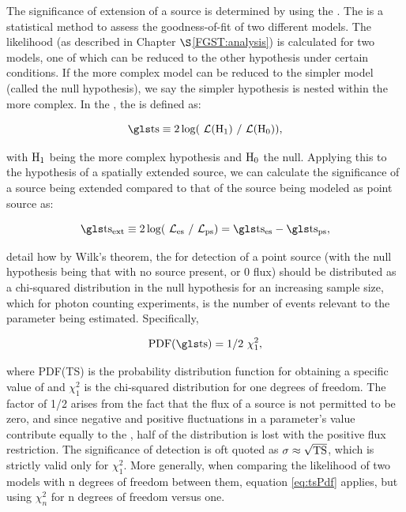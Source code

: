 {The significance of extension of a source is determined by using the \lrt{}. The \lrt{} is a statistical method to assess the goodness-of-fit of two different models. The likelihood (as described in Chapter $\S$\ref{FGST:analysis}) is calculated  for two models, one of which can be reduced to the other hypothesis under certain conditions. If the more complex model can be reduced to the simpler model (called the null hypothesis), we say the simpler hypothesis is nested within the more complex. In the \lrt{}, the \ts{} is defined as: 

\begin{equation}
\rm \ts{} \equiv 2\log(\like{}(H_1)~/ \like{}(H_0)),
\end{equation}

with ${\rm H_1}$ being the more complex hypothesis and ${\rm H_0}$ the null. Applying this to the hypothesis of a spatially extended source, we can calculate the significance of a source being extended compared to that of the source being modeled as point source as:

\begin{equation}\label{eq:tsext}
\rm \ts{}_{ext} \equiv 2\log(\like_{\rm es}~/ \like_{\rm ps}) = \ts{}_{es} - \ts{}_{ps},
\end{equation}

\cite{mattox96} detail how by Wilk's theorem, the \ts{} for detection of a point source (with the null hypothesis being that with no source present, or 0 flux) should be distributed as a chi-squared  distribution in the null hypothesis for an increasing sample size, which for photon counting experiments, is the number of events relevant to the parameter being estimated. Specifically, 

\begin{equation}\label{eq:tsPdf}
\rm PDF(\ts{}) = 1/2~\chi^2_1,
\end{equation} 

where PDF(TS) is the probability distribution function for obtaining a specific value of \ts{} and $\chi^2_1$ is the chi-squared  distribution for one degrees of freedom. The factor of 1/2 arises from the fact that the flux of a source is not permitted to be zero, and since negative and positive fluctuations in a parameter's value contribute equally to the \ts{}, half of the distribution is lost with the positive flux restriction. The significance of detection is oft quoted as ${\rm \sigma \approx \sqrt{TS}}$, which is strictly valid only for $\chi^2_1$. More generally, when comparing the likelihood of two models with n degrees of freedom between them, equation \ref{eq:tsPdf} applies, but using  $\chi^2_n$ for n degrees of freedom versus one.

}
